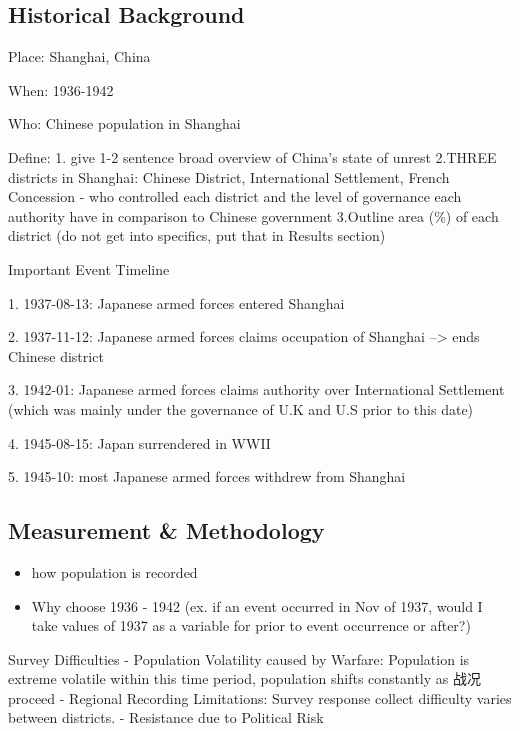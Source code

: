 \documentclass[
  letterpaper,
  DIV=11,
  numbers=noendperiod]{scrartcl}
\providecommand{\tightlist}{%
  \setlength{\itemsep}{0pt}\setlength{\parskip}{0pt}}\usepackage{longtable,booktabs,array}
\begin{document}
\hypertarget{historical-background}{%
\subsection{Historical Background}\label{historical-background}}

Place: Shanghai, China

When: 1936-1942

Who: Chinese population in Shanghai

Define: 1. give 1-2 sentence broad overview of China's state of unrest
2.THREE districts in Shanghai: Chinese District, International
Settlement, French Concession - who controlled each district and the
level of governance each authority have in comparison to Chinese
government 3.Outline area (\%) of each district (do not get into
specifics, put that in Results section)

Important Event Timeline

1. 1937-08-13: Japanese armed forces entered Shanghai

2. 1937-11-12: Japanese armed forces claims occupation of Shanghai
--\textgreater{} ends Chinese district

3. 1942-01: Japanese armed forces claims authority over International
Settlement (which was mainly under the governance of U.K and U.S prior
to this date)

4. 1945-08-15: Japan surrendered in WWII

5. 1945-10: most Japanese armed forces withdrew from Shanghai

\hypertarget{measurement-methodology}{%
\subsection{Measurement \& Methodology}\label{measurement-methodology}}

\begin{itemize}
\tightlist
\item
  how population is recorded
\item
  Why choose 1936 - 1942 (ex. if an event occurred in Nov of 1937, would
  I take values of 1937 as a variable for prior to event occurrence or
  after?)
\end{itemize}

Survey Difficulties - Population Volatility caused by Warfare:
Population is extreme volatile within this time period, population
shifts constantly as 战况 proceed - Regional Recording Limitations:
Survey response collect difficulty varies between districts. -
Resistance due to Political Risk
\end{document}
